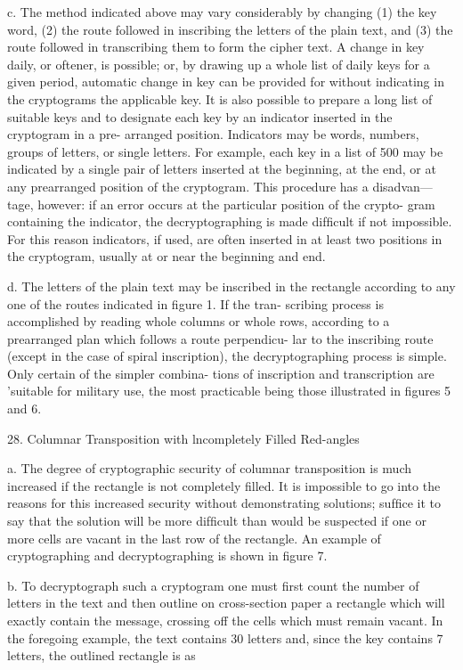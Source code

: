 c. The method indicated above may vary considerably by changing
(1) the key word, (2) the route followed in inscribing the letters of the
plain text, and (3) the route followed in transcribing them to form the
cipher text. A change in key daily, or oftener, is possible; or, by drawing
up a whole list of daily keys for a given period, automatic change in key
can be provided for without indicating in the cryptograms the applicable
key. It is also possible to prepare a long list of suitable keys and to
designate each key by an indicator inserted in the cryptogram in a pre-
arranged position. Indicators may be words, numbers, groups of letters,
or single letters. For example, each key in a list of 500 may be indicated
by a single pair of letters inserted at the beginning, at the end, or at any
prearranged position of the cryptogram. This procedure has a disadvan—
tage, however: if an error occurs at the particular position of the crypto-
gram containing the indicator, the decryptographing is made difﬁcult if
not impossible. For this reason indicators, if used, are often inserted
in at least two positions in the cryptogram, usually at or near the
beginning and end.

d. The letters of the plain text may be inscribed in the rectangle
according to any one of the routes indicated in ﬁgure 1. If the tran-
scribing process is accomplished by reading whole columns or whole
rows, according to a prearranged plan which follows a route perpendicu-
lar to the inscribing route (except in the case of spiral inscription), the
decryptographing process is simple. Only certain of the simpler combina-
tions of inscription and transcription are 'suitable for military use, the
most practicable being those illustrated in ﬁgures 5 and 6.

28. Columnar Transposition with lncompletely Filled Red-angles

a. The degree of cryptographic security of columnar transposition is
much increased if the rectangle is not completely ﬁlled. It is impossible
to go into the reasons for this increased security without demonstrating
solutions; sufﬁce it to say that the solution will be more difﬁcult than
would be suspected if one or more cells are vacant in the last row of the
rectangle. An example of cryptographing and decryptographing is shown
in figure 7.

b. To decryptograph such a cryptogram one must ﬁrst count the
number of letters in the text and then outline on cross-section paper a
rectangle which will exactly contain the message, crossing off the cells
which must remain vacant. In the foregoing example, the text contains
30 letters and, since the key contains 7 letters, the outlined rectangle is as


